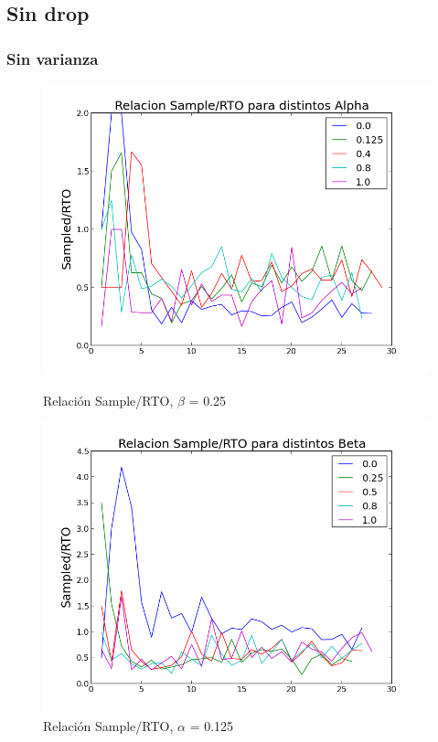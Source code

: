 \subsection{Sin drop}

\subsubsection{Sin varianza}

\begin{figure}[H]
\begin{minipage}{0.5\linewidth}
\includegraphics[width=\linewidth]{../graficos/alphavar0drop0.png}
\caption{Relación Sample/RTO, $\beta$ = 0.25}\label{fig:alpha-var0-drop0}
\end{minipage}
\hfill
\begin{minipage}{0.5\linewidth}
\includegraphics[width=\linewidth]{../graficos/betavar0drop0.png}
\caption{Relación Sample/RTO, $\alpha$ = 0.125}\label{fig:beta-var0-drop0}
\end{minipage}
\end{figure}


